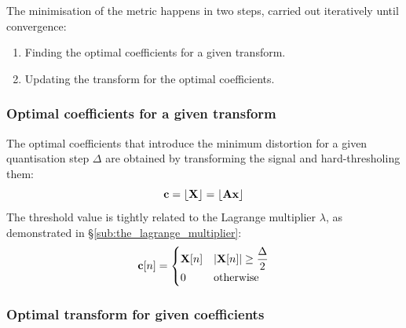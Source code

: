 \documentclass[11pt,a4paper,openright,twoside]{book}
\numberwithin{equation}{section} %
\numberwithin{figure}{section} %
\numberwithin{table}{section} %
\begin{document}
The minimisation of the metric happens in two steps, carried out iteratively
until convergence:
\begin{enumerate}
	\item Finding the optimal coefficients for a given transform.
	\item Updating the transform for the optimal coefficients.
\end{enumerate}

\subsubsection{Optimal coefficients for a given transform}
\label{ssub:optimal_coefficients_for_a_given_transform}

The optimal coefficients that introduce the minimum distortion for a given
quantisation step $\Delta$ are obtained by transforming the signal and
hard-thresholing them:
\begin{equation}
	\mathbf{c} = \lfloor \mathbf{X} \rfloor = \lfloor \mathbf{A} \mathbf{x} \rfloor
\end{equation}
The threshold value is tightly related to the Lagrange multiplier $\lambda$,
as demonstrated in \S\ref{sub:the_lagrange_multiplier}:
\begin{equation}
	\mathbf{c}[n] =
	\begin{cases}
		\mathbf{X}[n] & \vert \mathbf{X}[n] \vert \ge \displaystyle \frac{\Delta}{2} \\
		0     & \text{otherwise} \\
	\end{cases}
	\label{eqn:hard_threshold}
\end{equation}

\subsubsection{Optimal transform for given coefficients}
\label{ssub:optimal_transform_for_given_coefficients}
\end{document}
